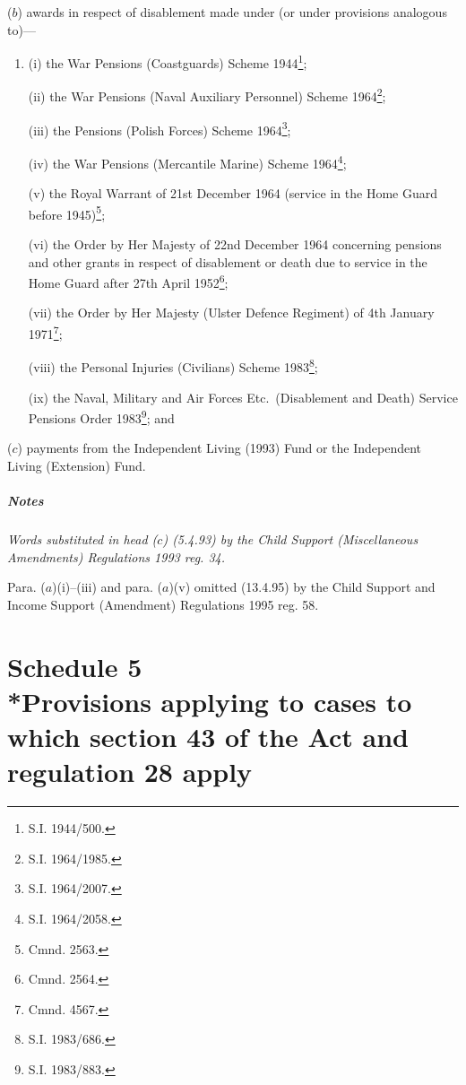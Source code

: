 \documentclass[a4paper]{article}
\newcommand\amendment[1]{\subsubsection*{Notes}{\itshape\frenchspacing\footnotesize #1 \par\goodbreak}}
\begin{document}
\begin{enumerate}
($b$) awards in respect of disablement made under (or under provisions analogous to)—
\begin{enumerate}\item[]
(i) the War Pensions (Coastguards) Scheme 1944\footnote{\frenchspacing S.I. 1944/500.};

(ii) the War Pensions (Naval Auxiliary Personnel) Scheme 1964\footnote{\frenchspacing S.I. 1964/1985.};

(iii) the Pensions (Polish Forces) Scheme 1964\footnote{\frenchspacing S.I. 1964/2007.};

(iv) the War Pensions (Mercantile Marine) Scheme 1964\footnote{\frenchspacing S.I. 1964/2058.};

(v) the Royal Warrant of 21st December 1964 (service in the Home Guard before 1945)\footnote{\frenchspacing Cmnd. 2563.};

(vi) the Order by Her Majesty of 22nd December 1964 concerning pensions and other grants in respect of disablement or death due to service in the Home Guard after 27th April 1952\footnote{\frenchspacing Cmnd. 2564.};

(vii) the Order by Her Majesty (Ulster Defence Regiment) of 4th January 1971\footnote{\frenchspacing Cmnd. 4567.};

(viii) the Personal Injuries (Civilians) Scheme 1983\footnote{\frenchspacing S.I. 1983/686.};

(ix) the Naval, Military and Air Forces Etc.\ (Disablement and Death) Service Pensions Order 1983\footnote{\frenchspacing S.I. 1983/883.}; and
\end{enumerate}

($c$) payments from 
the Independent Living (1993) Fund or the Independent Living (Extension) Fund. %
\end{enumerate}

\amendment{
Words substituted in head ($c$) (5.4.93) by the Child Support (Miscellaneous Amendments) Regulations 1993 reg. 34.

Para. ($a$)(i)--(iii) and para. ($a$)(v) omitted (13.4.95) by the Child Support and Income Support (Amendment) Regulations 1995 reg. 58.
}


\part[Schedule 5 --- Provisions applying to cases to which section 43 of the Act and regulation 28 apply]{Schedule 5\\*Provisions applying to cases to which section 43 of the Act and regulation 28 apply}
\end{document}

